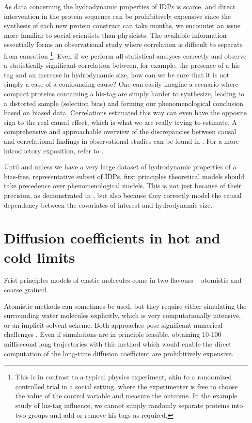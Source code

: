\documentclass{doctoral}
\begin{document}
As data concerning the hydrodynamic properties of IDPs is scarce, and direct intervention in the protein sequence can be prohibitively expensive since the synthesis of each new protein construct can take months, we encounter an issue more familiar to social scientists than physicists.
The available information essentially forms an observational study where correlation is difficult to separate from causation \footnote{This is in contrast to a typical physics experiment, akin to a randomized controlled trial in a social setting, where the experimenter is free to choose the value of the control variable and measure the outcome.
    In the example study of his-tag influence, we cannot simply randomly separate proteins into two groups and add or remove his-tags as required.
}.
Even if we perform all statistical analyses correctly and observe a statistically significant correlation between, for example, the presence of a his-tag and an increase in hydrodynamic size, how can we be sure that it is not simply a case of a confounding cause?
One can easily imagine a scenario where compact proteins containing a his-tag are simply harder to synthesize, leading to a distorted sample (selection bias) and forming our phenomenological conclusion based on biased data.
Correlations estimated this way can even have the opposite sign to the real causal effect, which is what we are really trying to estimate.
A comprehensive and approachable overview of the discrepancies between causal and correlational findings in observational studies can be found in \textcite{Cinelli_2022}.
For a more introductory exposition, refer to \textcite{Neal_2020}.

Until and unless we have a very large dataset of hydrodynamic properties of a bias-free, representative subset of IDPs, first principles theoretical models should take precedence over phenomenological models.
This is not just because of their precision, as demonstrated in \textcite{Waszkiewicz_2024_mda}, but also because they correctly model the causal dependency between the covariates of interest and hydrodynamic size.

\section{Diffusion coefficients in hot and cold limits}

Frist principles models of elastic molecules come in two flavours -- atomistic and coarse grained.

Atomistic methods can sometimes be used\cite{Karplus_1990}, but they require either simulating the surrounding water molecules explicitly, which is very computationally intensive, or an implicit solvent scheme.
Both approaches pose significant numerical challenges \cite{Frenkel_2001}.
Even if simulations are in principle feasible, obtaining 10-100 millisecond long trajectories with this method which would enable the direct computation of the long-time diffusion coefficient are prohibitively expensive.
\end{document}
